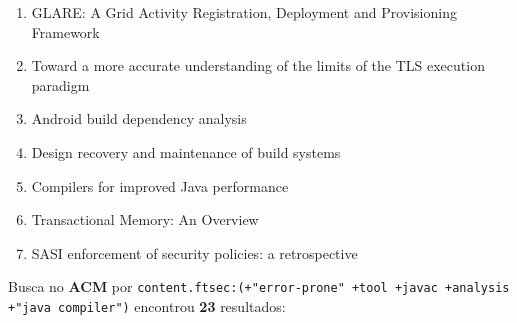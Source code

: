 \begin{enumerate}
\item GLARE: A Grid Activity Registration, Deployment and Provisioning Framework
\item Toward a more accurate understanding of the limits of the TLS execution paradigm
\item Android build dependency analysis
\item Design recovery and maintenance of build systems
\item Compilers for improved Java performance
\item Transactional Memory: An Overview
\item SASI enforcement of security policies: a retrospective
\end{enumerate}

Busca no {\bf ACM} por
\texttt{content.ftsec:(+"error-prone" +tool +javac +analysis +"java compiler")}
encontrou {\bf 23}
resultados:

